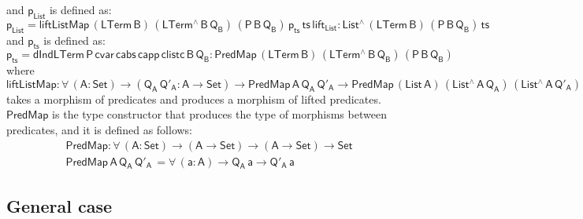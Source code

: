 \documentclass[9pt]{entcs}
\begin{document}
and $\mathsf{p_{List}}$ is defined as:
\[
  \mathsf{p_{List} = liftListMap \, (LTerm\, B) \, (LTerm^{\wedge} \, B \, Q_B)\, 
    (P\,B\,Q_B)\, p_{ts} \, ts\, lift_{List}  : List^{\wedge}\, (LTerm\,B) \, (P\,B\,Q_B) \, ts}
\]
and $\mathsf{p_{ts}}$ is defined as:
\[
\mathsf{
  p_{ts} = dIndLTerm\, P\, cvar\, cabs\, capp\, clistc\, B\, Q_B :  PredMap\,(LTerm\,B) \,(LTerm^{\wedge}\, B\, Q_B) \, (P\,B\,Q_B)
  }
\]
where 
\[
\mathsf{liftListMap : \forall\, (A : Set) \to (Q_A \, Q'_A : A \to Set) 
  \to PredMap\,A\,Q_A\,Q'_A \to PredMap\,(List\,A) \,(List^{\wedge}\, A\, Q_A)\, (List^{\wedge}\, A\, Q'_A)}
\]
takes a morphism of predicates and produces a morphism of lifted predicates. 
$\mathsf{PredMap}$ is the type constructor that produces the type of morphisms between predicates, and it is defined as follows: 
\begin{align*}
  &\mathsf{PredMap : \forall\, (A : Set) \to (A \to Set) \to (A \to Set) \to Set } \\
  &\mathsf{PredMap \,A\, Q_A\,Q'_A\, = \forall\, (a : A) \to Q_A\,a \to Q'_A\,a}
\end{align*}



\subsection{General case}

\end{document}
